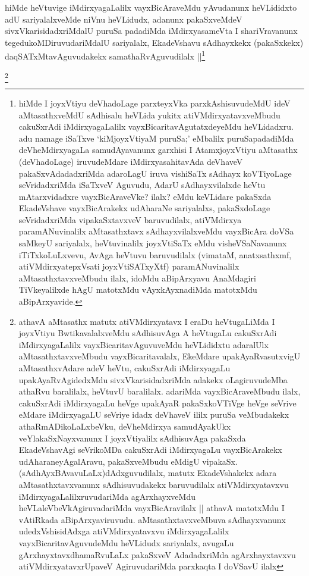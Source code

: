 \begin{artha}
hiMde heVtuvige iMdirxyagaLalilx vayxBicAraveMdu yAvudanunx heVLididxto adU sariyalalxveMde niVnu heVLidudx, adanunx pakaSxveMdeV sivxVkarisidadxriMdalU puruSa padadiMda iMdirxyasameVta I shariVravanunx tegedukoMDiruvudariMdalU sariyalalx, EkadeVshavu sAdhayxkekx (pakaSxkekx) daqSATxMtavAguvudakekx samathaRvAguvudilalx ||\footnote{hiMde I joyxVtiyu deVhadoLage parxteyxVka parxkAshisuvudeMdU ideV aMtasathxveMdU sAdhisalu heVLida yukitx atiVMdirxyatavxveMbudu cakuSxrAdi iMdirxyagaLalilx vayxBicaritavAgutatxdeyeMdu heVLidadxru. adu namage iSaTxve `kiMjoyxVtiyaM puruSa;' eMbalilx puruSapadadiMda deVheMdirxyagaLa samudAyavanunx garxhisi I AtamxjoyxVtiyu aMtasathx (deVhadoLage) iruvudeMdare iMdirxyasahitavAda deVhaveV pakaSxvAdadadxriMda adaroLagU iruva vishiSaTx sAdhayx koVTiyoLage seVridadxriMda iSaTxveV Aguvudu, AdarU sAdhayxvilalxde heVtu mAtarxvidadxre vayxBicAraveVke? ilalx? eMdu keVLidare pakaSxda EkadeVshave vayxBicArakekx udAharaNe sariyalalxs, pakaSxdoLage seVridadxriMda vipakaSxtavxveV baruvudilalx, atiVMdirxya paramANuvinalilx aMtasathxtavx sAdhayxvilalxveMdu vayxBicAra doVSa saMkeyU sariyalalx, heVtuvinalilx joyxVtiSaTx eMdu visheVSaNavanunx iTiTxkoLuLxvevu, AvAga heVtuvu baruvudilalx (vimataM, anatxsathxmf, atiVMdirxyatepxVsati joyxVtiSATxyXtf) paramANuvinalilx aMtasathxtavxveMbudu ilalx, idoMdu aBipArxyavu AnaMdagiri TiVkeyalilxde hAgU matotxMdu vAyxkAyxnadiMda matotxMdu aBipArxyavide.} 
\end{artha}

\footnote{athavA aMtasathx matutx atiVMdirxyatavx I eraDu heVtugaLiMda I joyxVtiyu BwtikavalalxveMdu sAdhisuvAga A heVtugaLu cakuSxrAdi iMdirxyagaLalilx vayxBicaritavAguvuveMdu heVLididxtu adaralUlx aMtasathxtavxveMbudu vayxBicaritavalalx, EkeMdare upakAyaRvasutxvigU aMtasathxvAdare adeV heVtu, cakuSxrAdi iMdirxyagaLu upakAyaRvAgidedxMdu sivxVkarisidadxriMda adakekx oLagiruvudeMba athaRvu baralilalx, heVtuvU baralilalx. adariMda vayxBicAraveMbudu ilalx, cakuSxrAdi iMdirxyagaLu heVge upakAyaR pakaSxkoVTiVge heVge seVrive eMdare iMdirxyagaLU seVriye idadx deVhaveV ililx puruSa veMbudakekx athaRmADikoLaLxbeVku, deVheMdirxya samudAyakUkx veYlakaSxNayxvanunx I joyxVtiyalilx sAdhisuvAga pakaSxda EkadeVshavAgi seVrikoMDa cakuSxrAdi iMdirxyagaLu vayxBicArakekx udAharaneyAgalAravu, pakaSxveMbudu eMdigU vipakaSx. (sAdhAyxBAvavuLaLx)dAdxguvudilalx, matutx EkadeVshakekx adara aMtasathxtavxvanunx sAdhisuvudakekx baruvudilalx atiVMdirxyatavxvu iMdirxyagaLalilxruvudariMda agArxhayxveMdu heVLaleVbeVkAgiruvadariMda vayxBicAravilalx || athavA matotxMdu I vAtiRkada aBipArxyaviruvudu. aMtasathxtavxveMbuva sAdhayxvanunx udedxVshisidAdxga atiVMdirxyatavxvu iMdirxyagaLalilx vayxBicaritavAguvudeMdu heVLidudx sariyalalx, avugaLu gArxhayxtavxdhamaRvuLaLx pakaSxveV AdadadxriMda agArxhayxtavxvu atiVMdirxyatavxrUpaveV AgiruvudariMda parxkaqta I doVSavU ilalx}

